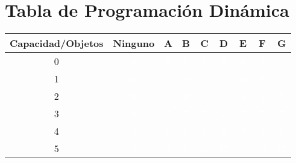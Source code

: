 \documentclass{article}
\begin{document}
\section*{Tabla de Programación Dinámica}
\begin{center}
\scriptsize
\begin{tabular}{|c|c|c|c|c|c|c|c|c|}
\hline
Capacidad/Objetos & Ninguno & A & B & C & D & E & F & G \\ \hline
0 & \cellcolor{rojo}\textcolor{white}{0} & \cellcolor{rojo}\textcolor{white}{0} & \cellcolor{rojo}\textcolor{white}{0} & \cellcolor{rojo}\textcolor{white}{0} & \cellcolor{rojo}\textcolor{white}{0} & \cellcolor{rojo}\textcolor{white}{0} & \cellcolor{rojo}\textcolor{white}{0} & \cellcolor{rojo}\textcolor{white}{0} \\ \hline
1 & \cellcolor{rojo}\textcolor{white}{0} & \cellcolor{rojo}\textcolor{white}{0} & \cellcolor{rojo}\textcolor{white}{0} & \cellcolor{rojo}\textcolor{white}{0} & \cellcolor{rojo}\textcolor{white}{0} & \cellcolor{rojo}\textcolor{white}{0} & \cellcolor{rojo}\textcolor{white}{0} & \cellcolor{rojo}\textcolor{white}{0} \\ \hline
2 & \cellcolor{rojo}\textcolor{white}{0} & \cellcolor{rojo}\textcolor{white}{0} & \cellcolor{rojo}\textcolor{white}{0} & \cellcolor{verde}\textcolor{white}{5} & \cellcolor{rojo}\textcolor{white}{5} & \cellcolor{rojo}\textcolor{white}{5} & \cellcolor{rojo}\textcolor{white}{5} & \cellcolor{rojo}\textcolor{white}{5} \\ \hline
3 & \cellcolor{rojo}\textcolor{white}{0} & \cellcolor{verde}\textcolor{white}{7} & \cellcolor{rojo}\textcolor{white}{7} & \cellcolor{rojo}\textcolor{white}{7} & \cellcolor{rojo}\textcolor{white}{7} & \cellcolor{rojo}\textcolor{white}{7} & \cellcolor{rojo}\textcolor{white}{7} & \cellcolor{rojo}\textcolor{white}{7} \\ \hline
4 & \cellcolor{rojo}\textcolor{white}{0} & \cellcolor{verde}\textcolor{white}{7} & \cellcolor{verde}\textcolor{white}{9} & \cellcolor{rojo}\textcolor{white}{9} & \cellcolor{rojo}\textcolor{white}{9} & \cellcolor{rojo}\textcolor{white}{9} & \cellcolor{rojo}\textcolor{white}{9} & \cellcolor{rojo}\textcolor{white}{9} \\ \hline
5 & \cellcolor{rojo}\textcolor{white}{0} & \cellcolor{verde}\textcolor{white}{7} & \cellcolor{verde}\textcolor{white}{9} & \cellcolor{verde}\textcolor{white}{12} & \cellcolor{rojo}\textcolor{white}{12} & \cellcolor{rojo}\textcolor{white}{12} & \cellcolor{rojo}\textcolor{white}{12} & \cellcolor{rojo}\textcolor{white}{12} \\ \hline

\end{tabular}
\end{center}
\end{document}
